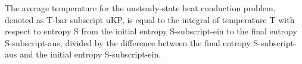 The average temperature for the unsteady-state heat conduction problem, denoted as T-bar subscript uKP, is equal to the integral of temperature T with respect to entropy S from the initial entropy S-subscript-ein to the final entropy S-subscript-aus, divided by the difference between the final entropy S-subscript-aus and the initial entropy S-subscript-ein.